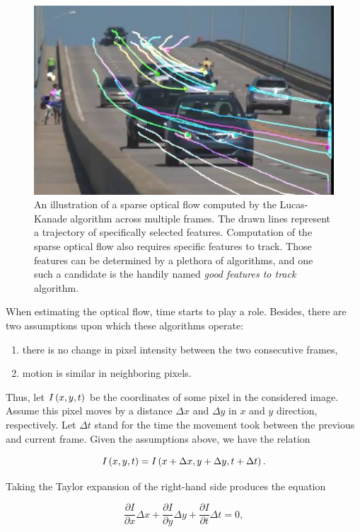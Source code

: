 \begin{figure}[t]
    \centerline{\includegraphics[width=0.5\linewidth]{figures/theoretical_foundations/opticalflow_lk.jpg}}
    \caption[Sparse optical flow]{An illustration of a sparse optical flow computed by the Lucas-Kanade algorithm \cite{Lucas1981} across multiple frames. The drawn lines represent a trajectory of specifically selected features. Computation of the sparse optical flow also requires specific features to track. Those features can be determined by a plethora of algorithms, and one such a candidate is the handily named \emph{good features to track} \cite{Shi1994} algorithm. }
    \label{fig:OpticalFlowLucasKanade}
\end{figure}

When estimating the optical flow, time starts to play a role. Besides, there are two assumptions upon which these algorithms operate:

\begin{enumerate}
    \item there is no change in pixel intensity between the two consecutive frames,
    \item motion is similar in neighboring pixels.
\end{enumerate}

\noindent Thus, let ${I} \left( x, y, t \right)$ be the coordinates of some pixel in the considered image. Assume this pixel moves by a distance $\Delta x$ and $\Delta y$ in $x$ and $y$ direction, respectively. Let $\Delta t$ stand for the time the movement took between the previous and current frame. Given the assumptions above, we have the relation

\begin{equation}
    {I} \left( x, y, t \right) = {I} \left( x + \Delta x, y + \Delta y, t + \Delta t \right).
\end{equation}

\noindent Taking the Taylor expansion of the right-hand side produces the equation

\begin{equation}
    \frac{\partial I}{\partial x} \Delta x +
    \frac{\partial I}{\partial y} \Delta y +
    \frac{\partial I}{\partial t} \Delta t =
    0,
\end{equation}

